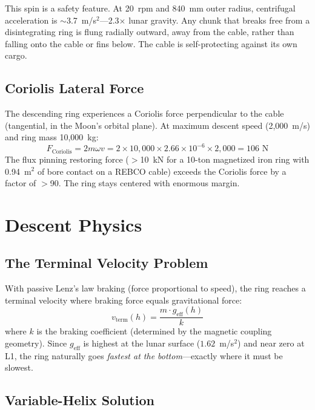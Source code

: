 \documentclass[12pt,letterpaper]{article}
\begin{document}
This spin is a safety feature. At 20~rpm and 840~mm outer radius, centrifugal acceleration is ${\sim}$3.7~m/s$^2$---2.3$\times$ lunar gravity. Any chunk that breaks free from a disintegrating ring is flung radially outward, away from the cable, rather than falling onto the cable or fins below. The cable is self-protecting against its own cargo.

\subsection{Coriolis Lateral Force}

The descending ring experiences a Coriolis force perpendicular to the cable (tangential, in the Moon's orbital plane). At maximum descent speed (2,000~m/s) and ring mass 10{,}000~kg:
\begin{equation}
F_{\text{Coriolis}} = 2 m \omega v = 2 \times 10{,}000 \times 2.66 \times 10^{-6} \times 2{,}000 = 106 \text{~N}
\end{equation}
The flux pinning restoring force ($>$10~kN for a 10-ton magnetized iron ring with 0.94~m$^2$ of bore contact on a REBCO cable) exceeds the Coriolis force by a factor of $>$90. The ring stays centered with enormous margin.

\section{Descent Physics}

\subsection{The Terminal Velocity Problem}

With passive Lenz's law braking (force proportional to speed), the ring reaches a terminal velocity where braking force equals gravitational force:
\begin{equation}
v_{\text{term}}(h) = \frac{m \cdot g_{\text{eff}}(h)}{k}
\end{equation}
where $k$ is the braking coefficient (determined by the magnetic coupling geometry). Since $g_{\text{eff}}$ is highest at the lunar surface ($1.62$~m/s$^2$) and near zero at L1, the ring naturally goes \emph{fastest at the bottom}---exactly where it must be slowest.

\subsection{Variable-Helix Solution}
\end{document}
